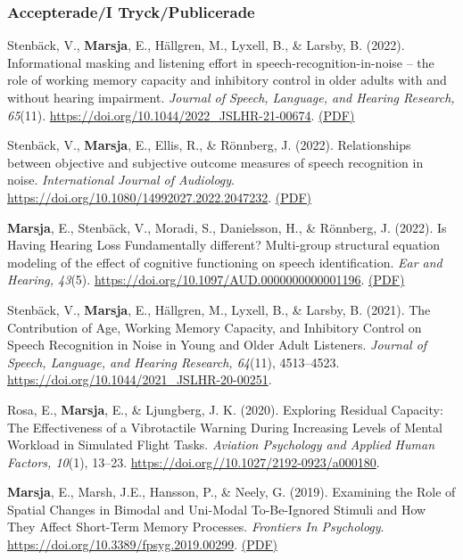 \documentclass[]{article}
\begin{document}
\hypertarget{accepteradei-tryckpublicerade}{%
\subsubsection{Accepterade/I
Tryck/Publicerade}\label{accepteradei-tryckpublicerade}}

Stenbäck, V., \textbf{Marsja}, E., Hällgren, M., Lyxell, B., \& Larsby,
B. (2022). Informational masking and listening effort in
speech-recognition-in-noise -- the role of working memory capacity and
inhibitory control in older adults with and without hearing impairment.
\emph{Journal of Speech, Language, and Hearing Research, 65}(11).
\url{https://doi.org/10.1044/2022_JSLHR-21-00674}. \href{}{(PDF)}

Stenbäck, V., \textbf{Marsja}, E., Ellis, R., \& Rönnberg, J. (2022).
Relationships between objective and subjective outcome measures of
speech recognition in noise. \emph{International Journal of Audiology}.
\url{https://doi.org/10.1080/14992027.2022.2047232}.
\href{https://bit.ly/IJA2022}{(PDF)}

\textbf{Marsja}, E., Stenbäck, V., Moradi, S., Danielsson, H., \&
Rönnberg, J. (2022). Is Having Hearing Loss Fundamentally different?
Multi-group structural equation modeling of the effect of cognitive
functioning on speech identification. \emph{Ear and Hearing, 43}(5).
\url{https://doi.org/10.1097/AUD.0000000000001196}.
\href{https://bit.ly/EANDH22}{(PDF)}

Stenbäck, V., \textbf{Marsja}, E., Hällgren, M., Lyxell, B., \& Larsby,
B. (2021). The Contribution of Age, Working Memory Capacity, and
Inhibitory Control on Speech Recognition in Noise in Young and Older
Adult Listeners. \emph{Journal of Speech, Language, and Hearing
Research, 64}(11), 4513--4523.
\url{https://doi.org/10.1044/2021_JSLHR-20-00251}.

Rosa, E., \textbf{Marsja}, E., \& Ljungberg, J. K. (2020). Exploring
Residual Capacity: The Effectiveness of a Vibrotactile Warning During
Increasing Levels of Mental Workload in Simulated Flight Tasks.
\emph{Aviation Psychology and Applied Human Factors, 10}(1), 13--23.
\url{https://doi.org//10.1027/2192-0923/a000180}.

\textbf{Marsja}, E., Marsh, J.E., Hansson, P., \& Neely, G. (2019).
Examining the Role of Spatial Changes in Bimodal and Uni-Modal
To-Be-Ignored Stimuli and How They Affect Short-Term Memory Processes.
\emph{Frontiers In Psychology}.
\url{https://doi.org/10.3389/fpsyg.2019.00299}.
\href{https://bit.ly/3LkKD19}{(PDF)}
\end{document}
